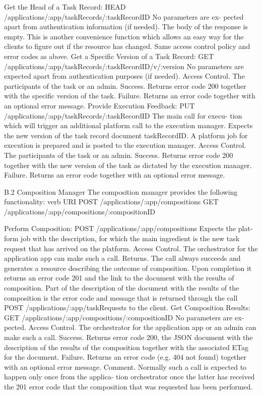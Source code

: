Get the Head of a Task Record:
HEAD /applications/:app/taskRecords/:taskRecordID No parameters are ex- pected apart from authentication information (if needed).
The body of the response is empty. This is another convenience function which allows an easy way for the clients to figure out if the resource has changed. Same access control policy and error codes as above.
Get a Specific Version of a Task Record:
GET /applications/:app/taskRecords/:taskRecordID/v/:version No parameters are expected apart from authentication purposes (if needed).
Access Control. The participants of the task or an admin.
Success. Returns error code 200 together with the specific version of the task. Failure. Returns an error code together with an optional error message.
Provide Execution Feedback:
PUT /applications/:app/taskRecords/:taskRecordID The main call for execu- tion which will trigger an additional platform call to the execution manager. Expects the new version of the task record document taskRecordID. A platform job for execution is prepared and is posted to the execution manager.
Access Control. The participants of the task or an admin.
Success. Returns error code 200 together with the new version of the task as dictated
by the execution manager.
Failure. Returns an error code together with an optional error message.

B.2 Composition Manager
The composition manager provides the following functionality:
verb
URI
POST
/applications/:app/compositions
GET
/applications/:app/compositions/:compositionID

Perform Composition: POST /applications/:app/compositions Expects the plat- form job with the description, for which the main ingredient is the new task request that has arrived on the platform.
Access Control. The orchestrator for the application app can make such a call.
Returns. The call always succeeds and generates a resource describing the outcome of composition. Upon completion it returns an error code 201 and the link to the document with the results of composition. Part of the description of the document with the results of the composition is the error code and message that is returned through the call POST /applications/:app/taskRequests to the client.
Get Composition Results:
GET /applications/:app/compositions/:compositionID No parameters are ex- pected.
Access Control. The orchestrator for the application app or an admin can make such a call.
Success. Returns error code 200, the JSON document with the description of the results of the composition together with the associated ETag for the document.
Failure. Returns an error code (e.g. 404 not found) together with an optional error message.
Comment. Normally such a call is expected to happen only once from the applica- tion orchestrator once the latter has received the 201 error code that the composition that was requested has been performed.

